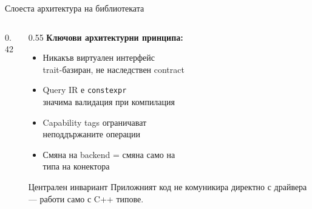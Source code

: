 \documentclass[aspectratio=169,12pt]{beamer}
\begin{document}
\begin{frame}{Слоеста архитектура на библиотеката}
    \begin{columns}[T]
        \begin{column}{0.42\textwidth}
            \centering
        \end{column}
        \begin{column}{0.55\textwidth}
            \textbf{Ключови архитектурни принципа:}
            \begin{itemize}\small
                \item Никакъв виртуален интерфейс\\
                    {\footnotesize trait-базиран, не наследствен contract}
                \item Query IR е \texttt{constexpr}\\
                    {\footnotesize значима валидация при компилация}
                \item Capability tags ограничават\\
                    неподдържаните операции
                \item Смяна на backend = смяна само на\\
                    типа на конектора
            \end{itemize}
            \vspace{0.05em}
            \begin{alertblock}{Централен инвариант}
                Приложният код не комуникира директно с драйвера —
                работи само с C++ типове.
            \end{alertblock}
        \end{column}
    \end{columns}
\end{frame}
\end{document}
